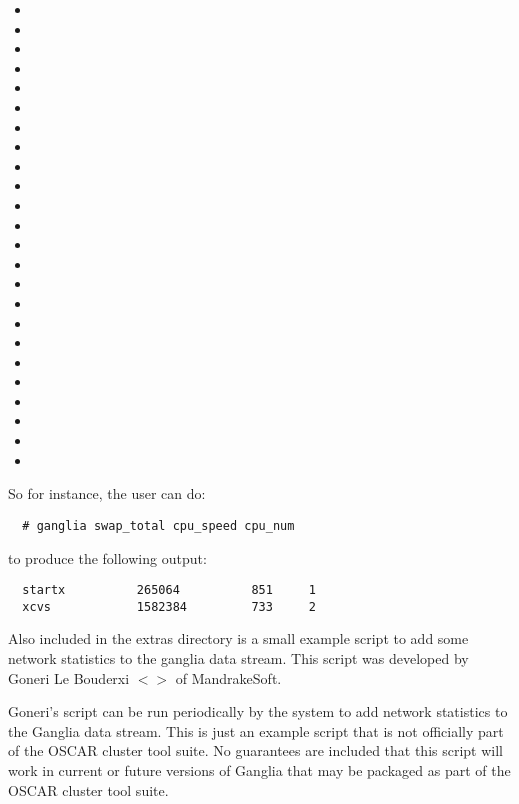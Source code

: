 \begin{itemize}
\item {}
\item {}
\item {}
\item {}
\item {}
\item {}
\item {}
\item {}
\item {}
\item {}
\item {}
\item {}
\item {}
\item {}
\item {}
\item {}
\item {}
\item {}
\item {}
\item {}
\item {}
\item {}
\item {}
\item {}
\end{itemize}

\noindent So for instance, the user can do:

\begin{verbatim}
  # ganglia swap_total cpu_speed cpu_num
\end{verbatim}

\noindent to produce the following output:

\begin{verbatim}
  startx          265064          851     1
  xcvs            1582384         733     2
\end{verbatim}

Also included in the extras directory is a small example script to add
some network statistics to the ganglia data stream.
This script was developed by Goneri Le Bouderxi
$<$$>$ of MandrakeSoft.
        
Goneri's  script can be run
periodically by the  system to add network statistics to the
Ganglia data stream. This is just an example script that is not officially
part of the OSCAR cluster tool suite. No guarantees are included that this
script will work in current or future versions of Ganglia that may be
packaged as part of the OSCAR cluster tool suite.

